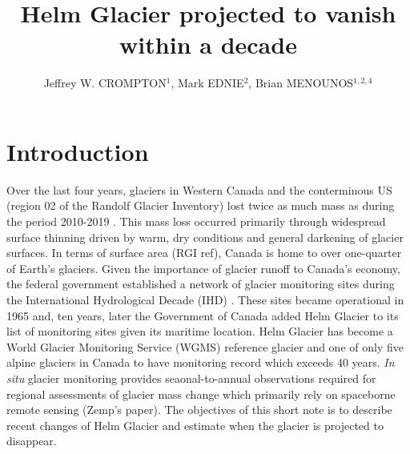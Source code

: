 \documentclass[annals,twocolumn,letterpaper]{igs.cls}
\begin{document}
\title[Deglaciation of Helm]{Helm Glacier projected to vanish within a decade}

\author[gsc]{Jeffrey W. CROMPTON$^1$, Mark EDNIE$^{2}$, Brian MENOUNOS$^{1,2,4}$}




\maketitle

\section{Introduction}

Over the last four years, glaciers in Western Canada and the conterminous US (region 02 of the Randolf Glacier Inventory) lost twice as much mass as during the period 2010-2019  \citep{Menounos2025}. This mass loss occurred primarily through widespread surface thinning driven by warm, dry conditions and general darkening of glacier surfaces. In terms of surface area (RGI ref), Canada is home to over one-quarter of Earth's glaciers.  Given the importance of glacier runoff to Canada's economy, the federal government established a network of glacier monitoring sites during the International Hydrological Decade (IHD) \citep{Ommanney1986}. These sites became operational in 1965 and, ten years, later the Government of Canada added Helm Glacier to its list of monitoring sites \cite{Ommanney2002} given its maritime location. Helm Glacier has become a World Glacier Monitoring Service (WGMS) reference glacier and one of only five alpine glaciers in Canada to have monitoring record which exceeds 40 years.   \emph{In situ} glacier monitoring provides seaonal-to-annual observations required for regional assessments of glacier mass change which primarily rely on spaceborne remote sensing (Zemp's paper). The objectives of this short note is to describe recent changes of Helm Glacier and estimate when the glacier is projected to disappear. 
\end{document}
